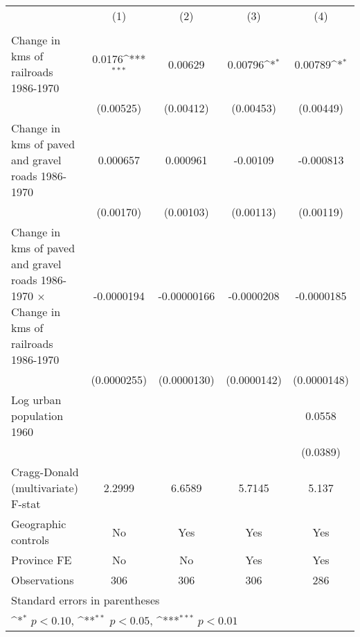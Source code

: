 {
\def\sym#1{\ifmmode^{#1}\else\(^{#1}\)\fi}
\begin{tabular}{l*{4}{c}}
\hline\hline
                &\multicolumn{1}{c}{(1)}&\multicolumn{1}{c}{(2)}&\multicolumn{1}{c}{(3)}&\multicolumn{1}{c}{(4)}\\
                &\multicolumn{1}{c}{}&\multicolumn{1}{c}{}&\multicolumn{1}{c}{}&\multicolumn{1}{c}{}\\
\hline
Change in kms of railroads 1986-1970&   0.0176\sym{***}&  0.00629         &  0.00796\sym{*}  &  0.00789\sym{*}  \\
                &(0.00525)         &(0.00412)         &(0.00453)         &(0.00449)         \\
[1em]
Change in kms of paved and gravel roads 1986-1970& 0.000657         & 0.000961         & -0.00109         &-0.000813         \\
                &(0.00170)         &(0.00103)         &(0.00113)         &(0.00119)         \\
[1em]
Change in kms of paved and gravel roads 1986-1970 $\times$ Change in kms of railroads 1986-1970&-0.0000194         &-0.00000166         &-0.0000208         &-0.0000185         \\
                &(0.0000255)         &(0.0000130)         &(0.0000142)         &(0.0000148)         \\
[1em]
Log urban population 1960&                  &                  &                  &   0.0558         \\
                &                  &                  &                  & (0.0389)         \\
\hline
Cragg-Donald (multivariate) F-stat&   2.2999         &   6.6589         &   5.7145         &    5.137         \\
Geographic controls&       No         &      Yes         &      Yes         &      Yes         \\
Province FE     &       No         &       No         &      Yes         &      Yes         \\
Observations    &      306         &      306         &      306         &      286         \\
\hline\hline
\multicolumn{5}{l}{\footnotesize Standard errors in parentheses}\\
\multicolumn{5}{l}{\footnotesize \sym{*} \(p<0.10\), \sym{**} \(p<0.05\), \sym{***} \(p<0.01\)}\\
\end{tabular}
}
